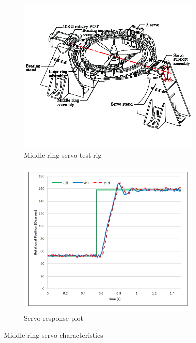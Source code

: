 \begin{figure}[hbtp]
\begin{subfigure}{0.5\textwidth}
\centering
\includegraphics[width=0.98\textwidth]{figs/servo-middle}
\caption{Middle ring servo test rig}
\label{fig:servo-middle}
\end{subfigure}
\begin{subfigure}{0.5\textwidth}
\centering
\includegraphics[width=0.98\textwidth]{graphs/servo-step-middle}
\caption{Servo response plot}
\label{fig:servo-step-middle}
\end{subfigure}
\caption{Middle ring servo characteristics}
\label{fig:servo-middle-character}
\vspace{-20pt}
\end{figure}
